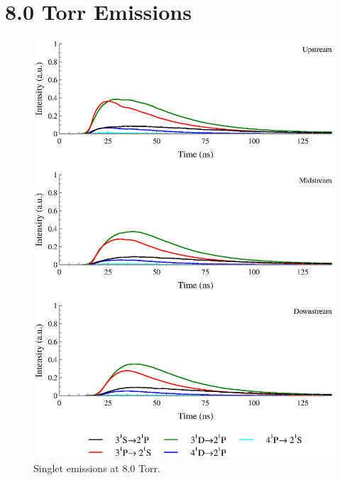\section{8.0 Torr Emissions}
\begin{figure}
  \centering
  \includegraphics{./chapters/extraem/figures/8torr_s.eps}
  \caption{Singlet emissions at 8.0 Torr.}
\end{figure}
